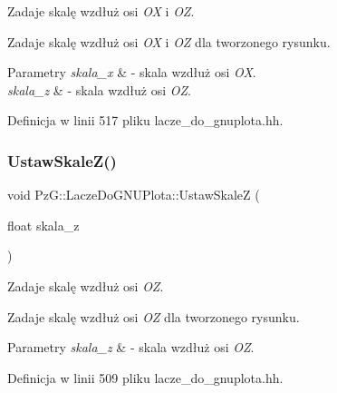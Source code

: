 Zadaje skalę wzdłuż osi {\itshape OX} i {\itshape OZ}. 

Zadaje skalę wzdłuż osi {\itshape OX} i {\itshape OZ} dla tworzonego rysunku. 
\begin{DoxyParams}{Parametry}
{\em skala\+\_\+x} & -\/ skala wzdłuż osi {\itshape OX}. \\
\hline
{\em skala\+\_\+z} & -\/ skala wzdłuż osi {\itshape OZ}. \\
\hline
\end{DoxyParams}


Definicja w linii 517 pliku lacze\+\_\+do\+\_\+gnuplota.\+hh.

\mbox{\label{class_pz_g_1_1_lacze_do_g_n_u_plota_ab0486db3166d8db6580a221079af241f}} 
\subsubsection{\texorpdfstring{Ustaw\+Skale\+Z()}{UstawSkaleZ()}}
{\footnotesize\ttfamily void Pz\+G\+::\+Lacze\+Do\+G\+N\+U\+Plota\+::\+Ustaw\+SkaleZ (\begin{DoxyParamCaption}\item[{float}]{skala\+\_\+z }\end{DoxyParamCaption})\hspace{0.3cm}{\ttfamily [inline]}}



Zadaje skalę wzdłuż osi {\itshape OZ}. 

Zadaje skalę wzdłuż osi {\itshape OZ} dla tworzonego rysunku. 
\begin{DoxyParams}{Parametry}
{\em skala\+\_\+z} & -\/ skala wzdłuż osi {\itshape OZ}. \\
\hline
\end{DoxyParams}


Definicja w linii 509 pliku lacze\+\_\+do\+\_\+gnuplota.\+hh.

\mbox{\label{class_pz_g_1_1_lacze_do_g_n_u_plota_a9c91987dfc869d6fcea96205c581daef}} 
